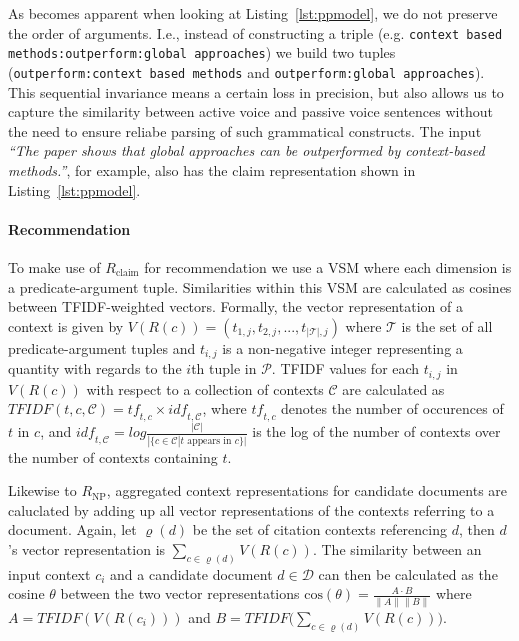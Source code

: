 As becomes apparent when looking at Listing~\ref{lst:ppmodel}, we do not preserve the order of arguments. I.e., instead of constructing a triple (e.g. \texttt{context based methods:outperform:global approaches}) we build two tuples (\texttt{outperform:context based methods} and \texttt{outper\-form:global approaches}). This sequential invariance means a certain loss in precision, but also allows us to capture the similarity between active voice and passive voice sentences without the need to ensure reliabe parsing of such grammatical constructs. The input \emph{``The paper shows that global approaches can be outperformed by context-based methods.''}, for example, also has the claim representation shown in Listing~\ref{lst:ppmodel}.

\paragraph{Recommendation} To make use of $R_{\text{claim}}$ for recommendation we use a VSM where each dimension is a predicate-argument tuple. Similarities within this VSM are calculated as cosines between TFIDF-weighted vectors. Formally, the vector representation of a context is given by $V(R(c)) = (t_{1,j}, t_{2,j}, ..., t_{|\mathcal{T}|,j})$ where $\mathcal{T}$ is the set of all predicate-argument tuples %
and $t_{i,j}$ is a non-negative integer representing a quantity with regards to the $i$th tuple in $\mathcal{P}$. TFIDF values for each $t_{i,j}$ in $V(R(c))$ with respect to a collection of contexts $\mathcal{C}$ are calculated as $\mathit{TFIDF}(t, c, \mathcal{C}) = \mathit{tf}_{t,c} \times \mathit{idf}_{t,\mathcal{C}}$, where $\mathit{tf}_{t,c}$ denotes the number of occurences of $t$ in $c$, and $\mathit{idf}_{t,\mathcal{C}} = \mathit{log}\frac{|\mathcal{C}|}{|\{c\in\mathcal{C}|t\text{ appears in }c\}|}$ is the log of the number of contexts over the number of contexts containing $t$.

Likewise to ${R_{\text{NP}}}$, aggregated context representations for candidate documents are caluclated by adding up all vector representations of the contexts referring to a document. Again, let $\varrho(d)$ be the set of citation contexts referencing $d$, then $d$'s vector representation is $\sum\limits_{c \in \varrho(d)} V(R(c))$. The similarity between an input context $c_i$ and a candidate document $d\in \mathcal{D}$ can then be calculated as the cosine $\theta$ between the two vector representations ${\mathrm{cos}(\theta)=\frac{A\cdot B}{\|A\| \|B\|}}$ where  $A=\mathit{TFIDF}(V(R(c_i)))$ and $B=\mathit{TFIDF}\Big(\sum\limits_{c \in \varrho(d)} V(R(c))\Big)$.



